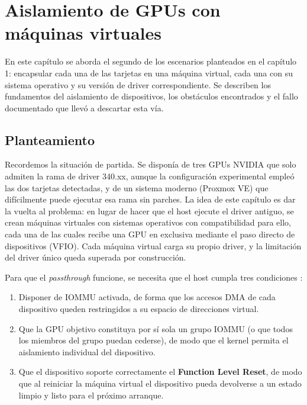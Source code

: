 \chapter{Aislamiento de GPUs con máquinas virtuales} \label{cap2}

En este capítulo se aborda el segundo de los escenarios planteados en el capítulo 1: encapsular cada una de las tarjetas en una máquina virtual, cada una con su sistema operativo y su versión de driver correspondiente. Se describen los fundamentos del aislamiento de dispositivos, los obstáculos encontrados y el fallo documentado que llevó a descartar esta vía.

\section{Planteamiento}

Recordemos la situación de partida. Se disponía de tres GPUs NVIDIA que solo admiten la rama de driver 340.xx, aunque la configuración experimental empleó las dos tarjetas detectadas, y de
un sistema moderno (Proxmox VE) que difícilmente puede ejecutar esa rama sin parches. La idea de este capítulo 
es dar la vuelta al problema: en lugar de hacer que el host ejecute el driver antiguo, se crean máquinas virtuales 
con sistemas operativos con compatibilidad para ello, cada una de las cuales recibe una GPU en exclusiva mediante 
el paso directo de 
dispositivos (VFIO). Cada máquina virtual carga su propio driver, y la limitación del driver único queda superada 
por construcción.

Para que el \textit{passthrough} funcione, se necesita que el host cumpla tres condiciones \cite{proxmox_pci_passthrough,kernel_vfio,supermicro_gpu_passthrough}:

\begin{enumerate}
    \item Disponer de IOMMU activada, de forma que los accesos DMA de cada dispositivo queden restringidos a su espacio de direcciones virtual.

    \item Que la GPU objetivo constituya por sí sola un grupo IOMMU (o que todos los miembros del grupo puedan cederse), de modo que el kernel permita el aislamiento individual del dispositivo.

    \item Que el dispositivo soporte correctamente el \textbf{Function Level Reset}, de modo que al reiniciar la máquina virtual el 
    dispositivo pueda devolverse a un estado limpio y listo para el próximo arranque.
\end{enumerate}

